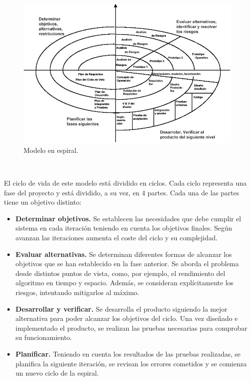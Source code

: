 \begin{figure} [hbtp]
  \begin{center}
    \includegraphics[width=16cm]{img/cap2/modelo_espiral}
  \end{center}
  \caption{Modelo en espiral.}
  \label{fig:modelo_espiral}
\end{figure}\

El ciclo de vida de este modelo está dividido en ciclos. Cada ciclo representa una fase del proyecto y está dividido, a su vez, en 4 partes. Cada una de las partes tiene un objetivo distinto:

\begin{itemize}
\item \textbf{Determinar objetivos.} Se establecen las necesidades que debe cumplir el sistema en cada iteración teniendo en cuenta los objetivos finales. Según avanzan las iteraciones aumenta el coste del ciclo y su complejidad.
\item \textbf{Evaluar alternativas.} Se determinan diferentes formas de alcanzar los objetivos que se han establecido en la fase anterior. Se aborda el problema desde distintos puntos de vista, como, por ejemplo, el rendimiento del algoritmo en tiempo y espacio. Además, se consideran explícitamente los riesgos, intentando mitigarlos al máximo.
\item \textbf{Desarrollar y verificar.} Se desarrolla el producto siguiendo la mejor alternativa para poder alcanzar los objetivos del ciclo. Una vez diseñado e implementado el producto, se realizan las pruebas necesarias para comprobar su funcionamiento.
\item \textbf{Planificar.} Teniendo en cuenta los resultados de las pruebas realizadas, se planifica la siguiente iteración, se revisan los errores cometidos y se comienza un nuevo ciclo de la espiral.
\end{itemize}

